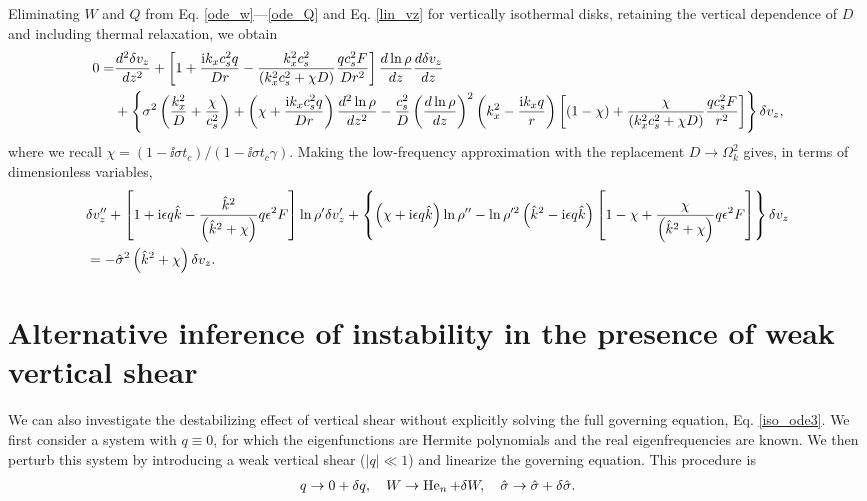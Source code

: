  Eliminating $W$ and $Q$ from Eq. \ref{ode_w}---\ref{ode_Q} and
 Eq. \ref{lin_vz} for vertically isothermal disks, retaining the
 vertical dependence of $D$ and including thermal relaxation, we
 obtain 
\begin{align}
  0 =& \frac{d^2\delta v_z}{dz^2} + \left[1 + \frac{\mathrm{i} k_x c_s^2
      q}{Dr} - \frac{k_x^2c_s^2}{\left(k_x^2c_s^2 + \chi
        D\right)}\frac{qc_s^2F}{Dr^2}\right]\frac{d\ln\rho}{dz}\frac{d\delta
    v_z}{dz} \notag\\
  &+ \left\{\sigma^2\left(\frac{k_x^2}{D} +
      \frac{\chi}{c_s^2}\right) + \left(\chi + \frac{\mathrm{i} k_x c_s^2
        q}{Dr}\right)\frac{d^2\ln\rho}{dz^2} -
    \frac{c_s^2}{D}\left(\frac{d\ln\rho}{dz}\right)^2\left(k_x^2 -
      \frac{\mathrm{i} k_x q}{r}\right)
   \left[\left(1-\chi\right) +
     \frac{\chi}{\left(k_x^2c_s^2 + \chi D\right)}\frac{qc_s^2 F}{r^2}\right] 
   \right\}\delta v_z,
\end{align}
where we recall $\chi = \left(1-\ii\sigma t_c\right)/\left(1-\ii\sigma
t_c \gamma\right)$. Making the low-frequency approximation with the
replacement $D\to \Omega_k^2$ gives, in terms of dimensionless
variables,
\begin{align}
   &\delta v_z ^{\prime\prime} + \left[1 + \mathrm{i}\epsilon q\hat{k} -
    \frac{ \hat{k}^2}{
      \left(\hat{k}^2+\chi\right)}q \epsilon^2F\right]\ln\rho^{\prime}\delta v_z^\prime +
  \left\{\left(\chi + \mathrm{i} \epsilon q
      \hat{k}\right)\ln\rho^{\prime\prime} - \ln\rho^{\prime
      2}\left(\hat{k}^2 -
      \mathrm{i}\epsilon
      q\hat{k}\right)\left[1 - \chi +
      \frac{\chi}{\left(\hat{k}^2+\chi\right)}q\epsilon^2F\right]\right\}\delta v_z \notag\\&=
  -\hat{\sigma}^2\left(\hat{k}^2+\chi\right)\delta v_z\label{adia_diso3}.
\end{align}   


\section{Alternative inference of instability in the presence of weak
  vertical shear}\label{pert_theory}
We can also investigate the destabilizing effect of vertical shear
without explicitly solving the full governing equation,
Eq. \ref{iso_ode3}. We first
consider a system with $q\equiv0$, for which the eigenfunctions are
Hermite polynomials and the real eigenfrequencies are known. We then
perturb this system by introducing a weak vertical shear ($|q|\ll1$)
and linearize the governing equation. This procedure is
\begin{align}   
  q \to 0 + \delta q,\quad
  W \to \operatorname{He}_n + \delta W,\quad
  \hat{\sigma} \to \hat{\sigma} + \delta\hat{\sigma}. 
\end{align}


